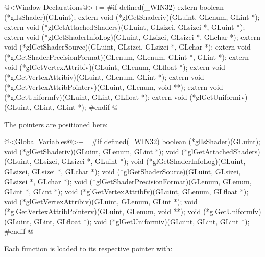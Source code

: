 \iniciocodigo
@<Window Declarations@>+=
#if defined(_WIN32)
extern boolean (*glIsShader)(GLuint);
extern void (*glGetShaderiv)(GLuint, GLenum, GLint *);
extern void (*glGetAttachedShaders)(GLuint, GLsizei, GLsizei *, GLuint *);
extern void (*glGetShaderInfoLog)(GLuint, GLsizei, GLsizei *, GLchar *);
extern void (*glGetShaderSource)(GLuint, GLsizei, GLsizei *, GLchar *);
extern void (*glGetShaderPrecisionFormat)(GLenum, GLenum, GLint *, GLint *);
extern void (*glGetVertexAttribfv)(GLuint, GLenum, GLfloat *);
extern void (*glGetVertexAttribiv)(GLuint, GLenum, GLint *);
extern void (*glGetVertexAttribPointerv)(GLuint, GLenum, void **);
extern void (*glGetUniformfv)(GLuint, GLint, GLfloat *);
extern void (*glGetUniformiv)(GLuint, GLint, GLint *);
#endif
@
\fimcodigo

The pointers are positioned here:

\iniciocodigo
@<Global Variables@>+=
#if defined(_WIN32)
boolean (*glIsShader)(GLuint);
void (*glGetShaderiv)(GLuint, GLenum, GLint *);
void (*glGetAttachedShaders)(GLuint, GLsizei, GLsizei *, GLuint *);
void (*glGetShaderInfoLog)(GLuint, GLsizei, GLsizei *, GLchar *);
void (*glGetShaderSource)(GLuint, GLsizei, GLsizei *, GLchar *);
void (*glGetShaderPrecisionFormat)(GLenum, GLenum, GLint *, GLint *);
void (*glGetVertexAttribfv)(GLuint, GLenum, GLfloat *);
void (*glGetVertexAttribiv)(GLuint, GLenum, GLint *);
void (*glGetVertexAttribPointerv)(GLuint, GLenum, void **);
void (*glGetUniformfv)(GLuint, GLint, GLfloat *);
void (*glGetUniformiv)(GLuint, GLint, GLint *);
#endif
@
\fimcodigo

Each function is loaded to its respective pointer with:

